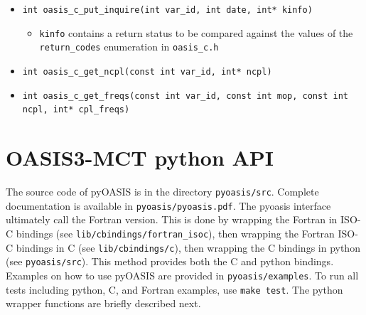 \begin{itemize}
\vspace{0.2cm}
\item {\tt int oasis\_c\_put\_inquire(int var\_id, int date, int* kinfo)}
  \begin{itemize}
  \item {\tt kinfo} contains a return status to be compared against
    the values of the {\tt return\_codes} enumeration in {\tt oasis\_c.h}
  \end{itemize}

\vspace{0.2cm}
\item {\tt int oasis\_c\_get\_ncpl(const int var\_id, int* ncpl)}

\vspace{0.2cm}
\item {\tt int oasis\_c\_get\_freqs(const int var\_id, const int mop, const int ncpl, int*  cpl\_freqs)}

\end{itemize}

\section{OASIS3-MCT python API}
\label{APIpython}

The source code of pyOASIS is in the directory  {\tt pyoasis/src}. Complete 
documentation is available in  {\tt pyoasis/pyoasis.pdf}. The pyoasis interface 
ultimately call the Fortran version.  This is done by wrapping the 
Fortran in ISO-C bindings (see  {\tt lib/cbindings/fortran\_isoc}), then 
wrapping the Fortran ISO-C bindings in C (see  {\tt lib/cbindings/c}), then 
wrapping the C bindings in python (see  {\tt pyoasis/src}).  This method 
provides both the C and python bindings.  Examples on how 
to use pyOASIS are provided in  {\tt pyoasis/examples}. To run all tests including python, C, and 
Fortran examples, use {\tt make test}. The python wrapper functions 
are briefly described next.

